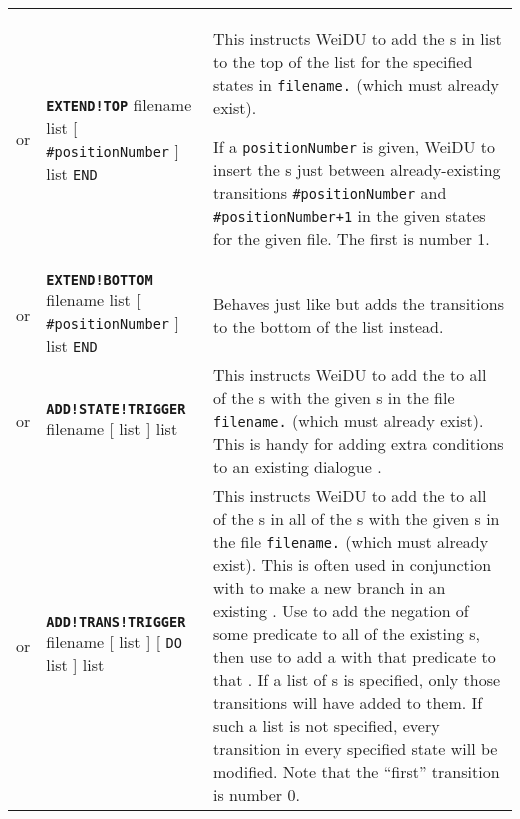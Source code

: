 \documentclass{article}
\def\ttref#1{\ahrefloc{#1}{\tt #1}}
\def\DEFINE#1{{\tt \bf #1}\label{#1}\index{#1}}
\def\t#1{{\tt #1}}
\def\Slist{{\color{red} list }}
\def\Ob{{\color{red} [ }}
\def\Oe{{\color{red} ] }}
\begin{document}
\begin{tabular}{cp{10in}|p{10in}}
  or   &
  \DEFINE{EXTEND!TOP}
    filename \ttref{stateLabel} \Slist \Ob {\tt \#positionNumber} \Oe
      \ttref{transition} \Slist \t{END} &
  This instructs WeiDU to add the \ttref{transition}s in list to the top of
  the \ttref{transition} list for the specified states in \t{filename.}\ttref{DLG}
  (which must already exist).

  If a \t{positionNumber} is given, WeiDU to insert the \ttref{transition}s
  just between already-existing transitions \t{\#positionNumber} and
  \t{\#positionNumber+1} in the given states for the given file. The first
  \ttref{transition} is number 1.  \\

  or & \DEFINE{EXTEND!BOTTOM} filename \ttref{stateNumber} \Slist \Ob {\tt
  \#positionNumber} \Oe \ttref{transition} \Slist \t{END} &
  Behaves just like \ttref{EXTEND!TOP} but adds the transitions to the
  bottom of the list instead.  \\

  or & \DEFINE{ADD!STATE!TRIGGER} filename \ttref{stateNumber}
    \ttref{stateTriggerString} \Ob \ttref{stateNumber} \Slist \Oe
	\ttref{dActionWhen} \Slist &
  This instructs WeiDU to add the \ttref{stateTriggerString} to all
  of the \ttref{state}s with the given \ttref{stateNumber}s in
  the file \t{filename.}\ttref{DLG} (which must already exist). This is handy for
  adding extra conditions to an existing dialogue \ttref{state}. \\

  or & \DEFINE{ADD!TRANS!TRIGGER} filename \ttref{stateNumber}
    \ttref{transTriggerString} \Ob \ttref{moreStateNumbers} \Slist \Oe
    \Ob \t{DO} \ttref{transNumber} \Slist \Oe \ttref{dActionWhen} \Slist
    &
  This instructs WeiDU to add the \ttref{transTriggerString} to all
  of the \ttref{transition}s in all of the \ttref{state}s with the given
  \ttref{stateNumber}s in the file \t{filename.}\ttref{DLG} (which must already
  exist). This is often used in conjunction with \ttref{EXTEND!BOTTOM} to
  make a new branch in an existing \ttref{state}. Use
  \ttref{ADD!TRANS!TRIGGER} to add the negation of some predicate to all of
  the existing \ttref{transition}s, then use \ttref{EXTEND!BOTTOM} to add a
  \ttref{transition} with that predicate to that \ttref{state}.
  If a list of \ttref{transNumber}s is specified, only those transitions
  will have \ttref{transTriggerString} added to them. If such a list is not
  specified, every transition in every specified state will be modified.
  Note that the ``first'' transition is number 0.
  \\


\end{tabular}
\end{document}
